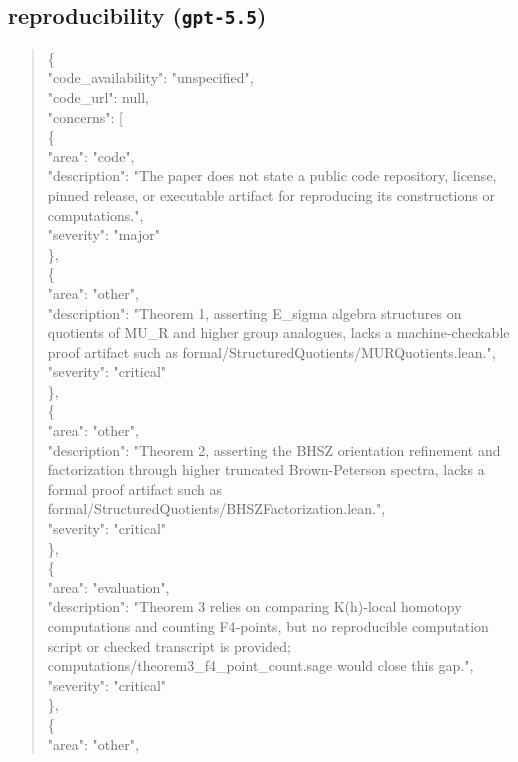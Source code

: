 \documentclass[11pt]{article}
\begin{document}
\subsection*{reproducibility (\texttt{gpt-5.5})}
\begin{quote}\small\ttfamily\raggedright
\{\\
  "code\_availability": "unspecified",\\
  "code\_url": null,\\
  "concerns": [\\
    \{\\
      "area": "code",\\
      "description": "The paper does not state a public code repository, license, pinned release, or executable artifact for reproducing its constructions or computations.",\\
      "severity": "major"\\
    \},\\
    \{\\
      "area": "other",\\
      "description": "Theorem 1, asserting E\_sigma algebra structures on quotients of MU\_R and higher group analogues, lacks a machine-checkable proof artifact such as formal/StructuredQuotients/MURQuotients.lean.",\\
      "severity": "critical"\\
    \},\\
    \{\\
      "area": "other",\\
      "description": "Theorem 2, asserting the BHSZ orientation refinement and factorization through higher truncated Brown-Peterson spectra, lacks a formal proof artifact such as formal/StructuredQuotients/BHSZFactorization.lean.",\\
      "severity": "critical"\\
    \},\\
    \{\\
      "area": "evaluation",\\
      "description": "Theorem 3 relies on comparing K(h)-local homotopy computations and counting F4-points, but no reproducible computation script or checked transcript is provided; computations/theorem3\_f4\_point\_count.sage would close this gap.",\\
      "severity": "critical"\\
    \},\\
    \{\\
      "area": "other",\\

\end{quote}
\end{document}
